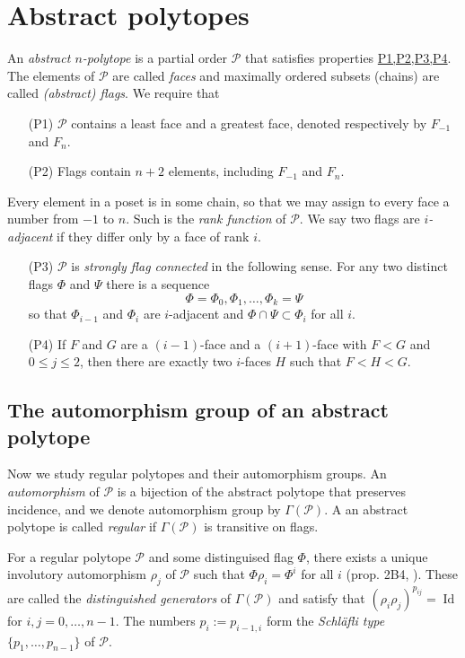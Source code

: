 \documentclass{article}
\theoremstyle{definition}
\newcommand{\p}{\mathcal{P}}
\DeclareMathOperator{\Id}{Id}
\begin{document}
	\section{Abstract polytopes}\label{sec:abstract-defs}
	An \textit{abstract $n$-polytope} is a partial order $\p$ that satisfies properties \hyperref[P1,P2,P3,P4]{P1,P2,P3,P4}. The elements of $\p$ are called \textit{faces} and maximally ordered subsets (chains) are called \textit{(abstract) flags}. We require that
	\begin{enumerate}
		\item[(P1)]\label{P1} $\p$ contains a least face and a greatest face, denoted respectively by $F_{-1}$ and $F_n$.
		\item[(P2)]\label{P2} Flags contain $n+2$ elements, including $F_{-1}$ and $F_n$.
	\end{enumerate}
	Every element in a poset is in some chain, so that we may assign to every face a number from $-1$ to $n$. Such is the \textit{rank function} of $\p$. We say two flags are \textit{$i$-adjacent} if they differ only by a face of rank $i$.
	\begin{enumerate}
		\item[(P3)]\label{P3} $\p$ is \textit{strongly flag connected} in the following sense. For any two distinct flags $\Phi$ and $\Psi$ there is a sequence
		\[\Phi=\Phi_0,\Phi_1,\ldots,\Phi_k=\Psi\]
		so that $\Phi_{i-1}$ and $\Phi_i$ are $i$-adjacent and $\Phi\cap\Psi\subset\Phi_i$ for all $i$.
		\item[(P4)]\label{P4} If $F$ and $G$ are a $(i-1)$-face and a $(i+1)$-face with $F<G$ and $0\leq j\leq2$, then there are exactly two $i$-faces $H$ such that $F<H<G$.
	\end{enumerate}

	\subsection{The automorphism group of an abstract polytope}
	Now we study regular polytopes and their automorphism groups. An \textit{automorphism} of $\p$ is a bijection of the abstract polytope that preserves incidence, and we denote automorphism group by $\Gamma(\p)$. A an abstract polytope is called \textit{regular} if $\Gamma(\p)$ is transitive on flags.
	
	For a regular polytope $\p$ and some distinguised flag $\Phi$, there exists a unique involutory automorphism $\rho_j$ of $\p$ such that $\Phi\rho_i=\Phi^i$ for all $i$ (prop. 2B4, \cite{abstract-polytopes}). These are called the \textit{distinguished generators} of $\Gamma(\p)$ and satisfy that $(\rho_i\rho_j)^{p_{ij}}=\Id$ for $i,j=0,\ldots,n-1$. The numbers $p_i:=p_{i-1,i}$ form the \textit{Schläfli type} $\{p_1,\ldots,p_{n-1}\}$ of $\p$.
	
\end{document}

